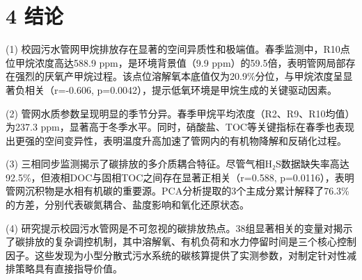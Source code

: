 \section{4 结论}

(1) 校园污水管网甲烷排放存在显著的空间异质性和极端值。春季监测中，R10点位甲烷浓度高达588.9 ppm，是环境背景值（9.9 ppm）的59.5倍，表明管网局部存在强烈的厌氧产甲烷过程。该点位溶解氧本底值仅为20.9\%分位，与甲烷浓度呈显著负相关（r=-0.606, p=0.0042），提示低氧环境是甲烷生成的关键驱动因素。

(2) 管网水质参数呈现明显的季节分异。春季甲烷平均浓度（R2、R9、R10均值）为237.3 ppm，显著高于冬季水平。同时，硝酸盐、TOC等关键指标在春季也表现出更强的空间变异性，表明温度升高加速了管网内的有机物降解和反硝化过程。

(3) 三相同步监测揭示了碳排放的多介质耦合特征。尽管气相H₂S数据缺失率高达92.5\%，但液相DOC与固相TOC之间存在显著正相关（r=0.588, p=0.0116），表明管网沉积物是水相有机碳的重要源。PCA分析提取的3个主成分累计解释了76.3\%的方差，分别代表碳氮耦合、盐度影响和氧化还原状态。

(4) 研究提示校园污水管网是不可忽视的碳排放热点。38组显著相关的变量对揭示了碳排放的复杂调控机制，其中溶解氧、有机负荷和水力停留时间是三个核心控制因子。这些发现为小型分散式污水系统的碳核算提供了实测参数，对制定针对性减排策略具有直接指导价值。